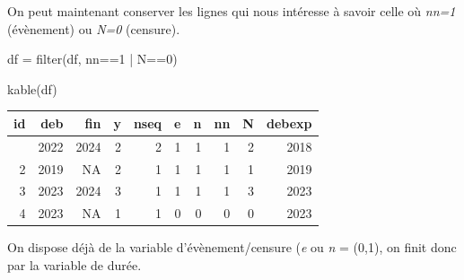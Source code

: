 \documentclass[
  12pt,
  letterpaper,
  DIV=11,
  numbers=noendperiod,
  onepage,
  openany]{scrreprt}
\newenvironment{Shaded}{\begin{snugshade}}{\end{snugshade}}
\newcommand{\DecValTok}[1]{\textcolor[rgb]{0.86,0.86,0.80}{#1}}
\newcommand{\FunctionTok}[1]{\textcolor[rgb]{0.94,0.94,0.56}{#1}}
\newcommand{\NormalTok}[1]{\textcolor[rgb]{0.80,0.80,0.80}{#1}}
\newcommand{\OtherTok}[1]{\textcolor[rgb]{0.94,0.94,0.56}{#1}}
\newcommand{\SpecialCharTok}[1]{\textcolor[rgb]{0.86,0.64,0.64}{#1}}
\begin{document}
On peut maintenant conserver les lignes qui nous intéresse à savoir
celle où \emph{nn=1} (évènement) ou \emph{N=0} (censure).

\begin{Shaded}
\begin{Highlighting}[]
\NormalTok{df }\OtherTok{=} \FunctionTok{filter}\NormalTok{(df, nn}\SpecialCharTok{==}\DecValTok{1} \SpecialCharTok{|}\NormalTok{ N}\SpecialCharTok{==}\DecValTok{0}\NormalTok{)}

\FunctionTok{kable}\NormalTok{(df)}
\end{Highlighting}
\end{Shaded}

\begin{longtable}[]{@{}rrrrrrrrrr@{}}
\toprule\noalign{}
id & deb & fin & y & nseq & e & n & nn & N & debexp \\
\midrule\noalign{}
\endhead
\bottomrule\noalign{}
\endlastfoot
1 & 2022 & 2024 & 2 & 2 & 1 & 1 & 1 & 2 & 2018 \\
2 & 2019 & NA & 2 & 1 & 1 & 1 & 1 & 1 & 2019 \\
3 & 2023 & 2024 & 3 & 1 & 1 & 1 & 1 & 3 & 2023 \\
4 & 2023 & NA & 1 & 1 & 0 & 0 & 0 & 0 & 2023 \\
\end{longtable}

On dispose déjà de la variable d'évènement/censure (\emph{e} ou \emph{n}
= (0,1), on finit donc par la variable de durée.

\begin{Shaded}
\end{Shaded}
\end{document}
